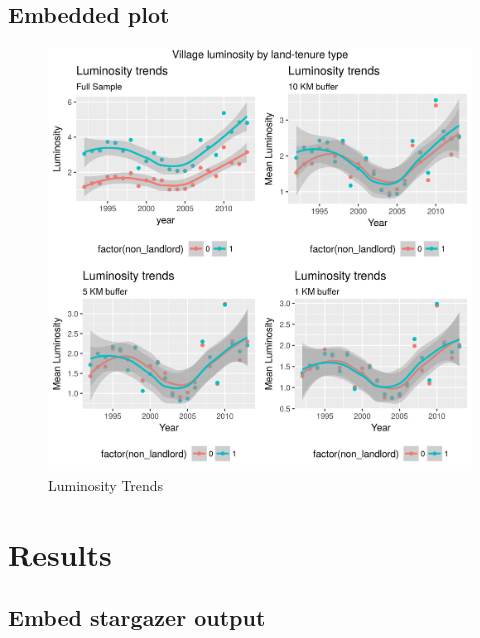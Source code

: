 \documentclass[12pt,]{article}
\begin{document}
\newpage

\subsection{Embedded plot}\label{embedded-plot}

\begin{figure}
\centering
\includegraphics{Figs/luminosity_grid.png}
\caption{Luminosity Trends}
\end{figure}

\newpage

\section{Results}\label{results}

\subsection{Embed stargazer output}\label{embed-stargazer-output}
\end{document}
